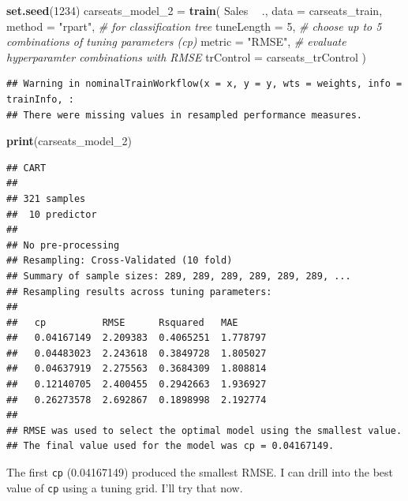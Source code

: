 \documentclass[
]{book}
\newenvironment{Shaded}{\begin{snugshade}}{\end{snugshade}}
\newcommand{\CommentTok}[1]{\textcolor[rgb]{0.56,0.35,0.01}{\textit{#1}}}
\newcommand{\DataTypeTok}[1]{\textcolor[rgb]{0.13,0.29,0.53}{#1}}
\newcommand{\DecValTok}[1]{\textcolor[rgb]{0.00,0.00,0.81}{#1}}
\newcommand{\KeywordTok}[1]{\textcolor[rgb]{0.13,0.29,0.53}{\textbf{#1}}}
\newcommand{\NormalTok}[1]{#1}
\newcommand{\OperatorTok}[1]{\textcolor[rgb]{0.81,0.36,0.00}{\textbf{#1}}}
\newcommand{\StringTok}[1]{\textcolor[rgb]{0.31,0.60,0.02}{#1}}
\begin{document}
\begin{Shaded}
\begin{Highlighting}[]
\KeywordTok{set.seed}\NormalTok{(}\DecValTok{1234}\NormalTok{)}
\NormalTok{carseats_model_}\DecValTok{2}\NormalTok{ =}\StringTok{ }\KeywordTok{train}\NormalTok{(}
\NormalTok{   Sales }\OperatorTok{~}\StringTok{ }\NormalTok{., }
   \DataTypeTok{data =}\NormalTok{ carseats_train, }
   \DataTypeTok{method =} \StringTok{"rpart"}\NormalTok{,  }\CommentTok{# for classification tree}
   \DataTypeTok{tuneLength =} \DecValTok{5}\NormalTok{,  }\CommentTok{# choose up to 5 combinations of tuning parameters (cp)}
   \DataTypeTok{metric =} \StringTok{"RMSE"}\NormalTok{,  }\CommentTok{# evaluate hyperparamter combinations with RMSE}
   \DataTypeTok{trControl =}\NormalTok{ carseats_trControl}
\NormalTok{)}
\end{Highlighting}
\end{Shaded}

\begin{verbatim}
## Warning in nominalTrainWorkflow(x = x, y = y, wts = weights, info = trainInfo, :
## There were missing values in resampled performance measures.
\end{verbatim}

\begin{Shaded}
\begin{Highlighting}[]
\KeywordTok{print}\NormalTok{(carseats_model_}\DecValTok{2}\NormalTok{)}
\end{Highlighting}
\end{Shaded}

\begin{verbatim}
## CART 
## 
## 321 samples
##  10 predictor
## 
## No pre-processing
## Resampling: Cross-Validated (10 fold) 
## Summary of sample sizes: 289, 289, 289, 289, 289, 289, ... 
## Resampling results across tuning parameters:
## 
##   cp          RMSE      Rsquared   MAE     
##   0.04167149  2.209383  0.4065251  1.778797
##   0.04483023  2.243618  0.3849728  1.805027
##   0.04637919  2.275563  0.3684309  1.808814
##   0.12140705  2.400455  0.2942663  1.936927
##   0.26273578  2.692867  0.1898998  2.192774
## 
## RMSE was used to select the optimal model using the smallest value.
## The final value used for the model was cp = 0.04167149.
\end{verbatim}

The first \texttt{cp} (0.04167149) produced the smallest RMSE. I can drill into the best value of \texttt{cp} using a tuning grid. I'll try that now.
\end{document}

